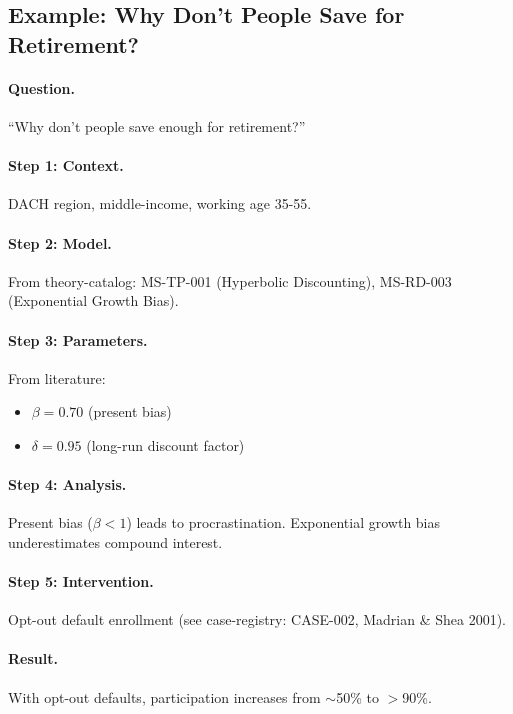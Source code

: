 \subsection{Example: Why Don't People Save for Retirement?}

\paragraph{Question.} ``Why don't people save enough for retirement?''

\paragraph{Step 1: Context.} DACH region, middle-income, working age 35-55.

\paragraph{Step 2: Model.} From theory-catalog: MS-TP-001 (Hyperbolic Discounting),
MS-RD-003 (Exponential Growth Bias).

\paragraph{Step 3: Parameters.} From literature:
\begin{itemize}[nosep]
\item $\beta = 0.70$ (present bias)
\item $\delta = 0.95$ (long-run discount factor)
\end{itemize}

\paragraph{Step 4: Analysis.} Present bias ($\beta < 1$) leads to
procrastination. Exponential growth bias underestimates compound interest.

\paragraph{Step 5: Intervention.} Opt-out default enrollment
(see case-registry: CASE-002, Madrian \& Shea 2001).

\paragraph{Result.} With opt-out defaults, participation increases from
$\sim$50\% to $>$90\%.


